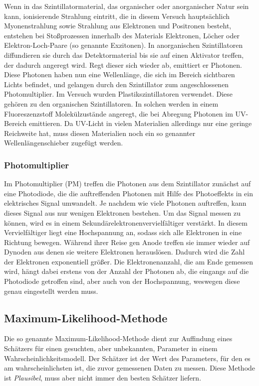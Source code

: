 \documentclass[slug=LM, room=Andreas-Schubert-Bau\,\ K\ 1A, supervisor=Anne-Sophie\ Berthold, coursedate=13.\ 12.\ 2019]{../../Lab_Report_LaTeX/lab_report}
\begin{document}
Wenn in das Szintillatormaterial, das organischer oder anorganischer Natur sein kann, ionisierende
Strahlung eintritt, die in diesem Versuch hauptsächlich Myonenstrahlung sowie Strahlung
aus Elektronen und Positronen besteht, entstehen bei Stoßprozessen innerhalb des Materials Elektronen,
Löcher oder Elektron-Loch-Paare (so genannte Exzitonen).
In anorganischen Szintillatoren diffundieren sie durch das
Detektormaterial bis sie auf einen Aktivator treffen, der dadurch angeregt wird. Regt dieser sich
wieder ab, emittiert er Photonen. Diese Photonen haben nun eine Wellenlänge, die sich im Bereich
sichtbaren Lichts befindet, und gelangen durch den Szintillator zum angeschlossenen
Photomultiplier.
Im Versuch wurden Plastikszintillatoren verwendet. Diese gehören zu den organischen Szintillatoren.
In solchen werden in einem Fluoreszenzstoff Molekülzustände angeregt, die bei Abregung Photonen
im UV-Bereich emittieren. Da UV-Licht in vielen Materialien allerdings nur eine geringe
Reichweite hat, muss diesen Materialien noch ein so genannter Wellenlängenschieber zugefügt werden.

\subsubsection{Photomultiplier}
\label{sec:photomulti}

Im Photomultiplier (PM) treffen die Photonen aus dem Szintillator zunächst auf eine Photodiode,
die die auftreffenden Photonen mit Hilfe des Photoeffekts in ein elektrisches Signal umwandelt.
Je nachdem wie viele Photonen auftreffen, kann dieses Signal aus nur wenigen Elektronen bestehen.
Um das Signal messen zu können, wird es in einem Sekundärelektronenvervielfältiger verstärkt.
In diesem Vervielfältiger liegt eine Hochspannung an, sodass sich alle Elektronen in eine Richtung
bewegen. Während ihrer Reise gen Anode treffen sie immer wieder auf Dynoden aus denen sie
weitere Elektronen herauslösen. Dadurch wird die Zahl der Elektronen exponentiell größer.
Die Elektronenanzahl, die am Ende gemessen wird, hängt dabei erstens von der Anzahl der Photonen
ab, die eingangs auf die Photodiode getroffen sind, aber auch von der Hochspannung, weswegen diese
genau eingestellt werden muss.

\subsection{Maximum-Likelihood-Methode}
\label{sec:likemeth}

Die so genannte Maximum-Likelihood-Methode dient zur Auffindung eines
Sch\"atzers f\"ur einen gesuchten, aber unbekannten, Parameter in
einem Wahrscheinlichkeitsmodell. Der Sch\"atzer ist der Wert des
Parameters, für den
es am wahrscheinlichsten ist, die zuvor gemessenen Daten zu
messen. Diese Methode ist \emph{Plausibel}, muss aber nicht immer den
besten Sch\"atzer liefern\cite[89]{Barlow}.\\
\end{document}
